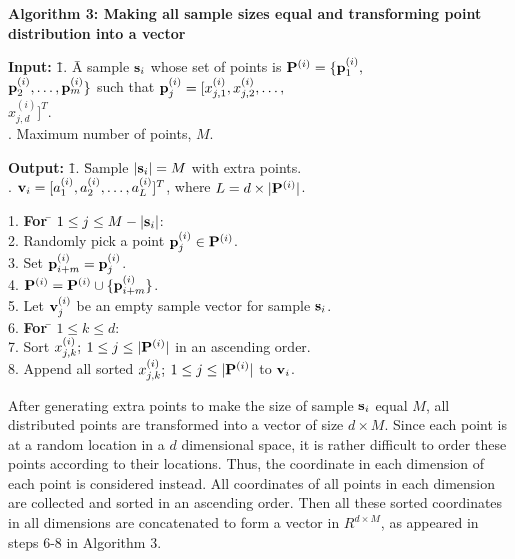 \documentclass[lettersize,journal]{IEEEtran}
\begin{document}
\vspace{0.2in}
\noindent
{\bf Algorithm 3: Making all sample sizes equal and transforming point distribution into a vector}
\begin{tabbing}
{\bf Input:} \= 1. \= A sample ${\bf s}_{i}$ whose set of points is ${\bf P}^{(i)} = \{{\bf p}^{(i)}_{1},$\\ 
             \>    \> ${\bf p}^{(i)}_{2}, \ldots, {\bf p}^{(i)}_{m}\}$ such that ${\bf p}^{(i)}_{j}  = 
                   [x^{(i)}_{j,1}, x^{(i)}_{j,2}, \ldots, $ \\
             \>    \> $x^{(i)}_{j,d}]^{T}$. \\
             . \> Maximum number of points, $M$.
\end{tabbing}
\begin{tabbing}
{\bf Output:} \= 1. \= Sample $|{\bf s}_{i}| = M$ with extra points.\\
              . \> ${\bf v}_{i} = [a^{(i)}_{1}, a^{(i)}_{2}, \ldots, a^{(i)}_{L}]^{T}$, where $L = d 
                    \times |{\bf P}^{(i)}|$.
\end{tabbing}

\begin{tabbing}
1. \= {\bf For} \= $1 \leq j \leq M - |{\bf s}_{i}|$:  \\
2. \>           \> Randomly pick a point ${\bf p}^{(i)}_{j} \in {\bf P}^{(i)}$. \\
3. \>           \> Set ${\bf p}^{(i)}_{i+m} = {\bf p}^{(i)}_{j}$. \\
4. \>           \> ${\bf P}^{(i)} = {\bf P}^{(i)} \cup \{{\bf p}^{(i)}_{i+m}\}$. \\
5. \> Let ${\bf v}^{(i)}_{j}$ be an empty sample vector for sample ${\bf s}_{i}$. \\
6. \> {\bf For} \= $1 \leq k \leq d$: \\
7. \>           \> Sort $x^{(i)}_{j,k}; \: 1 \leq j \leq |{\bf P}^{(i)}|$ in an ascending order. \\
8. \>           \> Append all sorted $x^{(i)}_{j,k}; \: 1 \leq j \leq |{\bf P}^{(i)}|$ to ${\bf v}_{i}$. 
\end{tabbing}

After generating extra points to make the size of sample ${\bf s}_{i}$ equal $M$, all distributed points 
are transformed into a vector of size $d \times M$. Since each point is at a random location in a $d$ 
dimensional space, it is rather difficult to order these points according to their locations. Thus, the 
coordinate in each dimension of each point is considered instead. All coordinates of all points in each 
dimension are collected and sorted in an ascending order. Then all these sorted coordinates in all 
dimensions are concatenated to form a vector in $R^{d \times M}$, as appeared in steps 6-8 in Algorithm 3.
\end{document}
